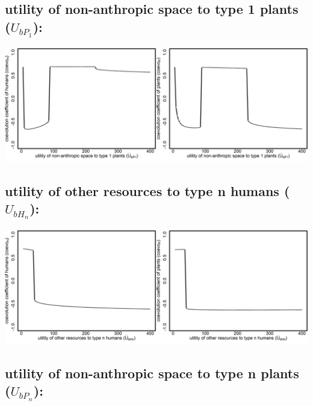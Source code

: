\documentclass[
]{book}
\begin{document}
\hypertarget{utility-of-non-anthropic-space-to-type-1-plants-u_bp_1}{%
\subsection{\texorpdfstring{utility \textbf{of} non-anthropic space \textbf{to} type 1 plants (\(U_{bP_{1}}\)):}{utility of non-anthropic space to type 1 plants (U\_\{bP\_\{1\}\}):}}\label{utility-of-non-anthropic-space-to-type-1-plants-u_bp_1}}

\includegraphics[width=1\linewidth]{plots/2_exp_utility_other_to_type_1_plants_bifurcationPlotPair}

\hypertarget{utility-of-other-resources-to-type-n-humans-u_bh_n}{%
\subsection{\texorpdfstring{utility \textbf{of} other resources \textbf{to} type n humans (\(U_{bH_{n}}\)):}{utility of other resources to type n humans (U\_\{bH\_\{n\}\}):}}\label{utility-of-other-resources-to-type-n-humans-u_bh_n}}

\includegraphics[width=1\linewidth]{plots/2_exp_utility_other_to_type_n_humans_bifurcationPlotPair}

\hypertarget{utility-of-non-anthropic-space-to-type-n-plants-u_bp_n}{%
\subsection{\texorpdfstring{utility \textbf{of} non-anthropic space \textbf{to} type n plants (\(U_{bP_{n}}\)):}{utility of non-anthropic space to type n plants (U\_\{bP\_\{n\}\}):}}\label{utility-of-non-anthropic-space-to-type-n-plants-u_bp_n}}
\end{document}

